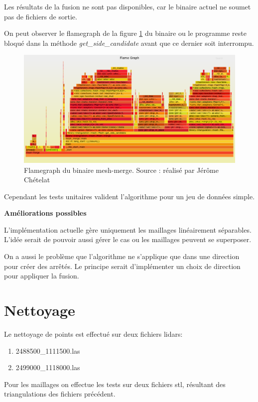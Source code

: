 Les résultats de la fusion ne sont pas disponibles, car le binaire actuel ne
soumet pas de fichiers de sortie.

On peut observer le flamegraph de la figure \ref{fig:flamegraph_mesh_merge}
du binaire ou le programme reste bloqué dans la méthode \textit{get\_side\_candidate}
avant que ce dernier soit interrompu.

\begin{figure}[htbp!]
    \centering
    \includegraphics[width=0.8\linewidth]{figures/merge-debug-flamegraph.png}
    \caption{Flamegraph du binaire mesh-merge. Source : réalisé par Jérôme Chételat}
    \label{fig:flamegraph_mesh_merge}
\end{figure}


Cependant les tests unitaires valident l'algorithme pour un jeu de données simple.

\textbf{Améliorations possibles}

L'implémentation actuelle gère uniquement les maillages linéairement séparables.
L'idée serait de pouvoir aussi gérer le cas ou les maillages peuvent se
superposer.

On a aussi le problème que l'algorithme ne s'applique que dans une direction
pour créer des arrêtés. Le principe serait d'implémenter un choix de direction
pour appliquer la fusion.

\section{Nettoyage}

Le nettoyage de points est effectué sur deux fichiers lidars:
\begin{enumerate}
    \item 2488500\_1111500.las
    \item 2499000\_1118000.las
\end{enumerate}

Pour les maillages on effectue les tests sur deux fichiers \gls{stl}, résultant des triangulations des fichiers précédent.

